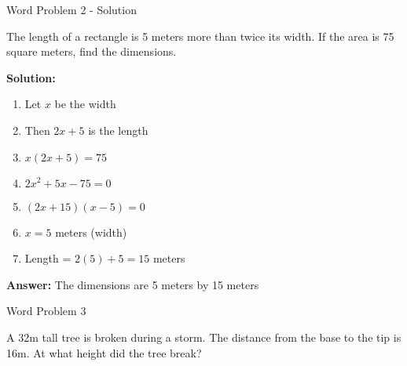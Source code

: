 \documentclass[aspectratio=169]{beamer}
\begin{document}
\begin{frame}{Word Problem 2 - Solution}
    \begin{tcolorbox}[colback=lightgray,colframe=accent,title=Detailed Solution]
        \footnotesize
        The length of a rectangle is 5 meters more than twice its width. If the area is 75 square meters, find the dimensions.
        
        \textbf{Solution:}
        \begin{enumerate}
            \setlength{\itemsep}{0.5em}
            \item Let $x$ be the width
            \item Then $2x + 5$ is the length
            \item $x(2x + 5) = 75$
            \item $2x^2 + 5x - 75 = 0$
            \item $(2x + 15)(x - 5) = 0$
            \item $x = 5$ meters (width)
            \item Length = $2(5) + 5 = 15$ meters
        \end{enumerate}
        
        \textbf{Answer:} The dimensions are 5 meters by 15 meters
    \end{tcolorbox}
\end{frame}

\begin{frame}{Word Problem 3}
    \begin{tcolorbox}[colback=lightgray,colframe=primary,title=Problem]
        \footnotesize
        A 32m tall tree is broken during a storm. The distance from the base to the tip is 16m. At what height did the tree break?
    \end{tcolorbox}
\end{frame}
\end{document}
